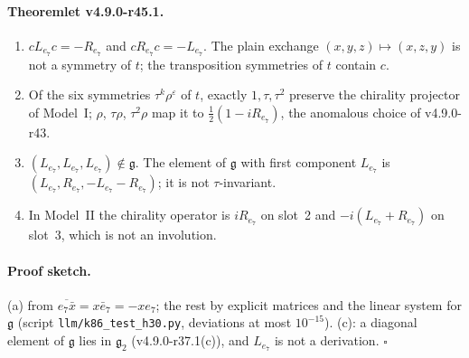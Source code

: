 \paragraph{Theoremlet v4.9.0-r45.1.}
\begin{enumerate}[leftmargin=2em]
\item[(a)] \(cL_{e_7}c=-R_{e_7}\) and \(cR_{e_7}c=-L_{e_7}\).  The plain exchange \((x,y,z)\mapsto(x,z,y)\) is not a symmetry of \(t\); the
transposition symmetries of \(t\) contain \(c\).
\item[(b)] Of the six symmetries \(\tau^k\rho^\varepsilon\) of \(t\), exactly \(1,\tau,\tau^2\) preserve the chirality projector of Model~I; \(\rho\),
\(\tau\rho\), \(\tau^2\rho\) map it to \(\tfrac12(1-iR_{e_7})\), the anomalous choice of v4.9.0-r43.
\item[(c)] \((L_{e_7},L_{e_7},L_{e_7})\notin\mathfrak g\).  The element of \(\mathfrak g\) with first component \(L_{e_7}\) is
\((L_{e_7},R_{e_7},-L_{e_7}-R_{e_7})\); it is not \(\tau\)-invariant.
\item[(d)] In Model~II the chirality operator is \(iR_{e_7}\) on slot~2 and \(-i(L_{e_7}+R_{e_7})\) on slot~3, which is not an involution.
\end{enumerate}

\paragraph{Proof sketch.}
(a) from \(\overline{e_7\bar x}=x\bar e_7=-xe_7\); the rest by explicit matrices and the linear system for \(\mathfrak g\) (script
\texttt{llm/k86\_test\_h30.py}, deviations at most \(10^{-15}\)).  (c): a diagonal element of \(\mathfrak g\) lies in \(\mathfrak g_2\)
(v4.9.0-r37.1(c)), and \(L_{e_7}\) is not a derivation.  \(\square\)


